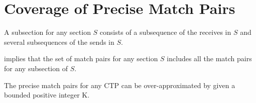 \section{Coverage of Precise Match Pairs}

\begin{definition}
A subsection for any section $S$ consists of a subsequence of the receives in $S$ and several subsequences of the sends in $S$.
\end{definition}

\begin{lemma}
 implies that the set of match pairs for any section $S$ includes all the match pairs for any subsection of $S$. 
\end{lemma}

\begin{theorem}
The precise match pairs for any CTP can be over-approximated by  given a bounded positive integer K.
\end{theorem}